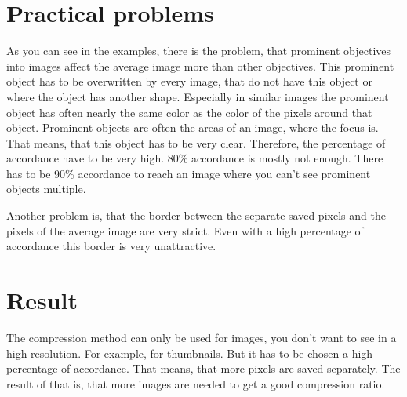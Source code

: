 \documentclass[10pt,a4paper,parskip=full]{scrartcl}
\begin{document}
	\justifying

	\section{Practical problems}
	As you can see in the examples, there is the problem, that prominent objectives into images affect the average image more than other objectives. This prominent object has to be overwritten by every image, that do not have this object or where the object has another shape. Especially in similar images the prominent object has often nearly the same color as the color of the pixels around that object. Prominent objects are often the areas of an image, where the focus is. That means, that this object has to be very clear.
	Therefore, the percentage of accordance have to be very high. 80\% accordance is mostly not enough. There has to be 90\% accordance to reach an image where you can't see prominent objects multiple.
	
	Another problem is, that the border between the separate saved pixels and the pixels of the average image are very strict. Even with a high percentage of accordance this border is very unattractive.
	
	\section{Result}
	The compression method can only be used for images, you don't want to see in a high resolution. For example, for thumbnails. But it has to be chosen a high percentage of accordance. That means, that more pixels are saved separately. The result of that is, that more images are needed to get a good compression ratio.
\end{document}
